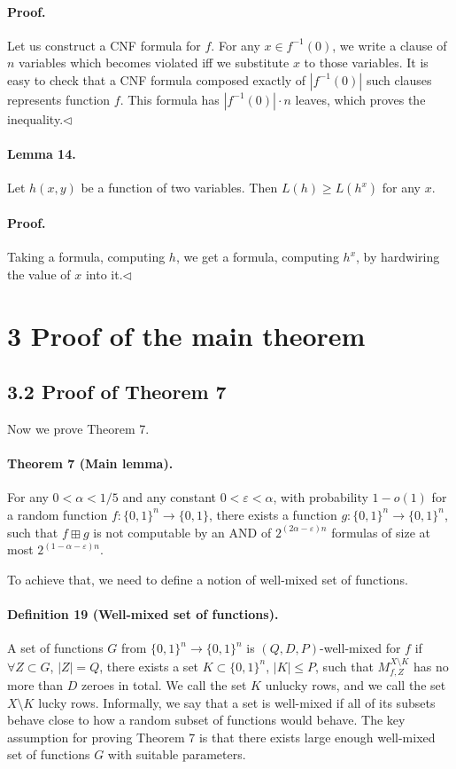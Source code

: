 \documentclass[10pt,a4paper]{article}
\begin{document}
\paragraph{Proof.} Let us construct a CNF formula for $f$. For any $x\in f^{-1}(0)$, we write a clause of $n$ variables which becomes violated iff we substitute $x$ to those variables. It is easy to check that a CNF formula composed exactly of $|f^{-1}(0)|$ such clauses represents function $f$. This formula has $|f^{-1}(0)|\cdot n$ leaves, which proves the inequality.\hfill$\triangleleft$
\paragraph{Lemma 14.} Let $h(x,y)$ be a function of two variables. Then $L(h)\geq L(h^x)$ for any $x$.
\paragraph{Proof.} Taking a formula, computing $h$, we get a formula, computing $h^x$, by hardwiring the value of $x$ into it.\hfill$\triangleleft$
\section*{3 Proof of the main theorem}
\subsection*{3.2 Proof of Theorem 7}
Now we prove Theorem 7.

\paragraph{Theorem 7 (Main lemma).} For any $0<\alpha<1/5$ and any constant $0<\varepsilon<\alpha$, with probability $1-o(1)$ for a random function $f:\{0,1\}^n\to\{0,1\}$, there exists a function $g:\{0,1\}^n\to\{0,1\}^n$, such that $f\boxplus g$ is not computable by an AND of $2^{(2\alpha-\varepsilon)n}$ formulas of size at most $2^{(1-\alpha-\varepsilon)n}$.

To achieve that, we need to define a notion of well-mixed set of functions.
\paragraph{Definition 19 (Well-mixed set of functions).} A set of functions $G$ from $\{0,1\}^n\to\{0,1\}^n$ is $(Q,D,P)$-well-mixed for $f$ if $\forall Z\subset G$, $|Z|=Q$, there exists a set $K\subset\{0,1\}^n$, $|K|\leq P$, such that $M_{f,Z}^{X\setminus K}$ has no more than $D$ zeroes in total. We call the set $K$ unlucky rows, and we call the set $X\setminus K$ lucky rows.
Informally, we say that a set is well-mixed if all of its subsets behave close to how a random subset of functions would behave.
The key assumption for proving Theorem 7 is that there exists large enough well-mixed set of functions $G$ with suitable parameters.
\end{document}
